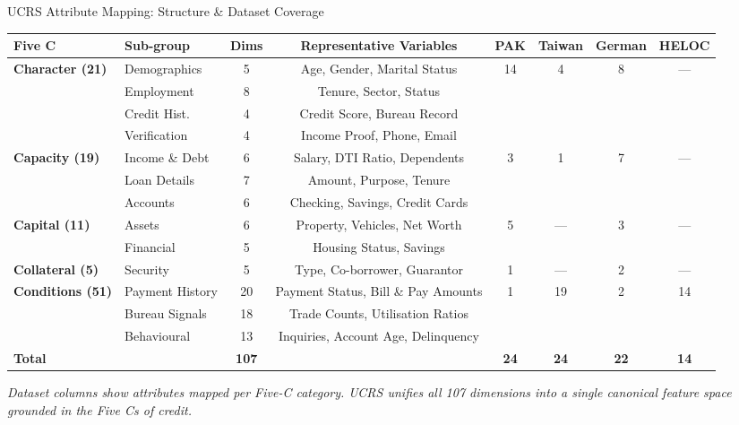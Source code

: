 \documentclass[9pt,aspectratio=169]{beamer}
\begin{document}
\begin{frame}{UCRS Attribute Mapping: Structure \& Dataset Coverage}
\vspace{-4pt}
\begin{center}
\footnotesize
\setlength{\tabcolsep}{4pt}
\begin{tabular}{llcc|cccc}
\toprule
\textbf{Five C} & \textbf{Sub-group} & \textbf{Dims} & \textbf{Representative Variables} & \textbf{PAK} & \textbf{Taiwan} & \textbf{German} & \textbf{HELOC}\\
\midrule
\multirow{4}{*}{\textbf{Character (21)}}
  & Demographics  &  5 & Age, Gender, Marital Status         & \multirow{4}{*}{14} & \multirow{4}{*}{4}  & \multirow{4}{*}{8} & \multirow{4}{*}{---}\\
  & Employment    &  8 & Tenure, Sector, Status              & & & & \\
  & Credit Hist.  &  4 & Credit Score, Bureau Record         & & & & \\
  & Verification  &  4 & Income Proof, Phone, Email          & & & & \\
\cmidrule{1-8}
\multirow{3}{*}{\textbf{Capacity (19)}}
  & Income \& Debt &  6 & Salary, DTI Ratio, Dependents      & \multirow{3}{*}{3}  & \multirow{3}{*}{1}  & \multirow{3}{*}{7} & \multirow{3}{*}{---}\\
  & Loan Details   &  7 & Amount, Purpose, Tenure            & & & & \\
  & Accounts       &  6 & Checking, Savings, Credit Cards    & & & & \\
\cmidrule{1-8}
\multirow{2}{*}{\textbf{Capital (11)}}
  & Assets    &  6 & Property, Vehicles, Net Worth           & \multirow{2}{*}{5}  & \multirow{2}{*}{---} & \multirow{2}{*}{3} & \multirow{2}{*}{---}\\
  & Financial &  5 & Housing Status, Savings                 & & & & \\
\cmidrule{1-8}
\textbf{Collateral (5)} & Security & 5 & Type, Co-borrower, Guarantor      & 1  & --- & 2  & ---\\
\cmidrule{1-8}
\multirow{3}{*}{\textbf{Conditions (51)}}
  & Payment History & 20 & Payment Status, Bill \& Pay Amounts & \multirow{3}{*}{1}  & \multirow{3}{*}{19} & \multirow{3}{*}{2} & \multirow{3}{*}{14}\\
  & Bureau Signals  & 18 & Trade Counts, Utilisation Ratios    & & & & \\
  & Behavioural     & 13 & Inquiries, Account Age, Delinquency & & & & \\
\midrule
\textbf{Total} & & \textbf{107} & & \textbf{24} & \textbf{24} & \textbf{22} & \textbf{14}\\
\bottomrule
\end{tabular}
\end{center}
\vspace{2pt}
{\scriptsize\textit{Dataset columns show attributes mapped per Five-C category. UCRS unifies all 107 dimensions into a single canonical feature space grounded in the Five Cs of credit.}}
\end{frame}
\end{document}

